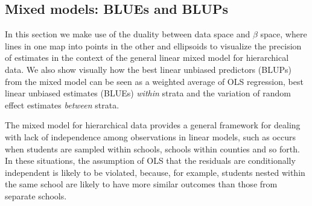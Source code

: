 \subsection{Mixed models: BLUEs and BLUPs}

In this section we make use of the duality between data space and $\beta$
space, where lines in one map into points in the other and ellipsoids to
visualize the precision of estimates in the context of the general linear mixed
model for hierarchical data.  We also show visually how the best linear unbiased
predictors (BLUPs) from the mixed model can be seen as a weighted average
of OLS regression, best linear unbiased estimates (BLUEs) \emph{within} strata
and the variation of random effect estimates \emph{between} strata.

The mixed model for hierarchical data provides a general framework for 
dealing with lack of independence among observations in linear models,
such as occurs when students are sampled within schools, schools within
counties and so forth. In these situations, the assumption of OLS that
the residuals are conditionally independent is likely to be violated,
because, for example, students nested within the same school are 
likely to have more similar outcomes than those from separate schools.

